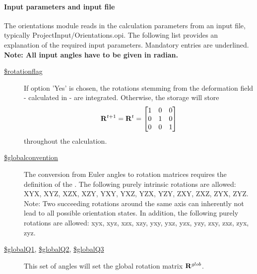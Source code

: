 \paragraph{Input parameters and input file} The orientations module reads in the calculation parameters from an input file, typically ProjectInput/Orientations.opi. The following list provides an explanation of the required input parameters. Mandatory entries are underlined. \textbf{Note: All input angles have to be given in radian.}
\begin{description}
 \item[\underline{\$rotationflag}] If option 'Yes' is chosen, the rotations stemming from the deformation field - calculated in  - are integrated. Otherwise, the storage  will store \begin{equation*} \mathbf{R}^{t+1} = \mathbf{R}^{t} = \begin{bmatrix} 1 & 0 & 0 \\ 0 & 1 & 0 \\ 0 & 0 & 1 \end{bmatrix}\end{equation*} throughout the calculation.
 \item[\underline{\$globalconvention}] The conversion from Euler angles to rotation matrices requires the definition of the . The following purely intrinsic rotations are allowed: XYX, XYZ, XZX, XZY, YXY, YXZ, YZX, YZY, ZXY, ZXZ, ZYX, ZYZ. Note: Two succeeding rotations around the same axis can inherently not lead to all possible orientation states. In addition, the following purely rotations are allowed: xyx, xyz, xzx, xzy, yxy, yxz, yzx, yzy, zxy, zxz, zyx, zyz.
 
  \item[\underline{\$globalQ1}, \underline{\$globalQ2}, \underline{\$globalQ3}] This set of angles will set the global rotation matrix $\mathbf{R}^{glob}$. 
\end{description}


